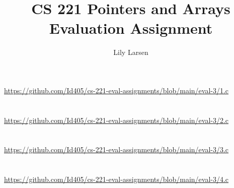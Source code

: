 \documentclass{article}
\title{CS 221 Pointers and Arrays Evaluation Assignment}
\author{Lily Larsen}
\begin{document}
\maketitle
\newpage

\section{}
\href{https://github.com/Id405/cs-221-eval-assignments/blob/main/eval-3/1.c}{https://github.com/Id405/cs-221-eval-assignments/blob/main/eval-3/1.c}
\newpage

\section{}
\href{https://github.com/Id405/cs-221-eval-assignments/blob/main/eval-3/2.c}{https://github.com/Id405/cs-221-eval-assignments/blob/main/eval-3/2.c}
\newpage

\section{}
\href{https://github.com/Id405/cs-221-eval-assignments/blob/main/eval-3/3.c}{https://github.com/Id405/cs-221-eval-assignments/blob/main/eval-3/3.c}
\newpage

\section{}
\href{https://github.com/Id405/cs-221-eval-assignments/blob/main/eval-3/4.c}{https://github.com/Id405/cs-221-eval-assignments/blob/main/eval-3/4.c}
\newpage
\newpage
\end{document}
